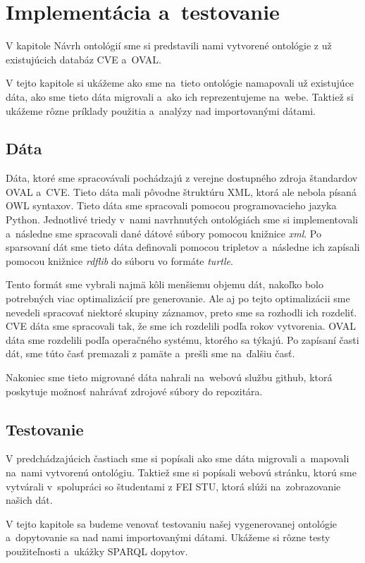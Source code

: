 \documentclass[12pt, a4paper, oneside]{book}
\begin{document}
\chapter{Implementácia a~testovanie}
V kapitole Návrh ontológií sme si predstavili nami vytvorené ontológie z už existujúcich databáz CVE a~OVAL.


V tejto kapitole si ukážeme ako sme na~tieto ontológie namapovali už existujúce dáta, ako sme tieto dáta migrovali a~ako ich reprezentujeme na~webe. Taktiež si ukážeme rôzne príklady použitia a~analýzy nad importovanými dátami.
\section{Dáta}
Dáta, ktoré sme spracovávali pochádzajú z verejne dostupného zdroja štandardov OVAL a~CVE. Tieto dáta mali pôvodne štruktúru XML, ktorá ale nebola písaná OWL syntaxov. Tieto dáta sme spracovali pomocou programovacieho jazyka Python. Jednotlivé triedy v~nami navrhnutých ontológiách sme si implementovali a~následne sme spracovali dané dátové súbory pomocou knižnice \textit{xml}. Po sparsovaní dát sme tieto dáta definovali pomocou tripletov a~následne ich zapísali pomocou knižnice \textit{rdflib} do súboru vo formáte \textit{turtle}. 


Tento formát sme vybrali najmä kôli menšiemu objemu dát, nakoľko bolo potrebných viac optimalizácií pre generovanie. Ale aj po tejto optimalizácii sme nevedeli spracovať niektoré skupiny záznamov, preto sme sa  rozhodli ich rozdeliť. CVE dáta sme spracovali tak, že sme ich rozdelili podľa rokov vytvorenia. OVAL dáta sme rozdelili podľa operačného systému, ktorého sa týkajú. Po zapísaní časti dát, sme túto časť premazali z pamäte a~prešli sme na~ďalšiu časť.


Nakoniec sme tieto migrované dáta nahrali na~webovú službu github, ktorá poskytuje možnosť nahrávať zdrojové súbory do repozitára.


\section{Testovanie}
V predchádzajúcich častiach sme si popísali ako sme dáta migrovali a~mapovali na~nami vytvorenú ontológiu. Taktiež sme si popísali webovú stránku, ktorú sme vytvárali v~spolupráci so študentami z FEI STU, ktorá slúži na~zobrazovanie našich dát.


V tejto kapitole sa budeme venovať testovaniu našej vygenerovanej ontológie a~dopytovanie sa nad nami importovanými dátami. Ukážeme si rôzne testy použiteľnosti a~ukážky SPARQL dopytov.
\end{document}
